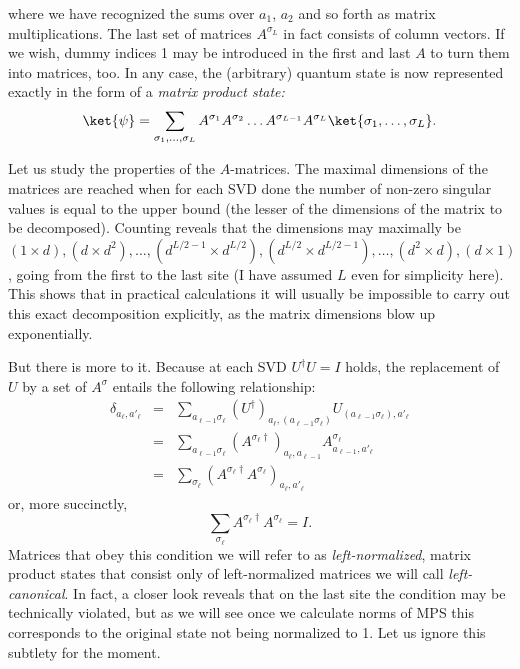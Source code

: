 where we have recognized the sums over $a_1$, $a_2$ and so forth as matrix multiplications. The last set of matrices $A^{\sigma_L}$ in fact consists of column vectors. If we wish, dummy indices 1 may be introduced in the first and last $A$ to turn them into matrices, too. In any case, the (arbitrary) quantum state is now represented exactly in the form of a {\em matrix product state:}
\begin{equation}
\ket{\psi} = \sum_{\sigma_1,\ldots,\sigma_L} A^{\sigma_1} A^{\sigma_2} \ldots A^{\sigma_{L-1}} A^{\sigma_L} \ket{\sigma_1,\ldots,\sigma_L} .
\end{equation}

Let us study the properties of the $A$-matrices. The maximal dimensions of the matrices are reached when for each SVD done the number of non-zero singular values is equal to the upper bound (the lesser of the dimensions of the matrix to be decomposed). Counting reveals that the dimensions may maximally be $(1 \times d), (d \times d^2), \ldots, (d^{L/2-1} \times d^{L/2}), (d^{L/2} \times d^{L/2-1}), \ldots, (d^2 \times d), (d \times 1)$, going from the first to the last site (I have assumed $L$ even for simplicity here). This shows that in practical calculations it will usually be impossible to carry out this exact decomposition explicitly, as the matrix dimensions blow up exponentially.

But there is more to it. Because at each SVD $U^\dagger U = I$ holds, the replacement of $U$ by a set of $A^\sigma$ entails the following relationship:
\begin{eqnarray*}
\delta_{a_\ell,a'_\ell} &=& \sum_{a_{\ell-1}\sigma_\ell} (U^\dagger)_{a_\ell, (a_{\ell-1}\sigma_\ell)} U_{(a_{\ell-1}\sigma_\ell), a'_\ell} \\
&=& \sum_{a_{\ell-1}\sigma_\ell} (A^{\sigma_\ell\dagger})_{a_\ell, a_{\ell-1}} A^{\sigma_\ell}_{a_{\ell-1}, a'_\ell} \\
&=& \sum_{\sigma_\ell} ( A^{\sigma_\ell\dagger} A^{\sigma_\ell})_{a_\ell,a'_\ell} 
\end{eqnarray*}
or, more succinctly,
\begin{equation}
\sum_{\sigma_\ell} A^{\sigma_\ell \dagger} A^{\sigma_\ell} = I . 
\end{equation}
Matrices that obey this condition we will refer to as {\em left-normalized}, matrix product states that consist only of left-normalized matrices we will call {\em left-canonical}. In fact, a closer look reveals that on the last site the condition may be technically violated, but as we will see once we calculate norms of MPS this corresponds to the original state not being normalized to 1. Let us ignore this subtlety for the moment.

